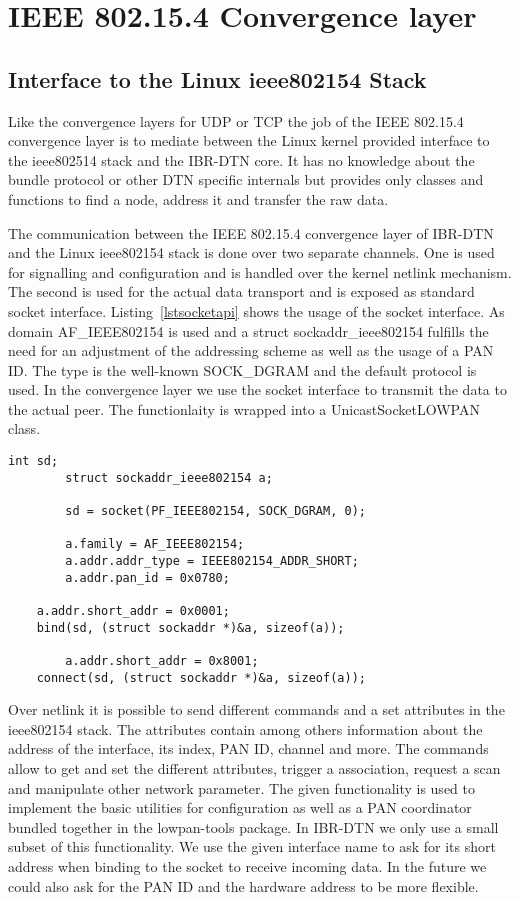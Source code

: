 \chapter{IEEE 802.15.4 Convergence layer}
\label{802154layer}
\section{Interface to the Linux ieee802154 Stack}

Like the convergence layers for UDP or TCP the job of the IEEE 802.15.4
convergence layer is to mediate between the Linux kernel provided interface
to the ieee802514 stack and the IBR-DTN core. It has no knowledge about the
bundle protocol or other DTN specific internals but provides only classes and
functions to find a node, address it and transfer the raw data.

The communication between the IEEE 802.15.4 convergence layer of IBR-DTN and the
Linux ieee802154 stack is done over two separate channels. One is used for
signalling and configuration and is handled over the kernel netlink mechanism.
The second is used for the actual data transport and is exposed as standard
socket interface. Listing~\ref{lstsocketapi} shows the usage of the socket interface.
As domain AF\_IEEE802154 is used and a struct sockaddr\_ieee802154 fulfills the
need for an adjustment of the addressing scheme as well as the usage of a PAN
ID. The type is the well-known SOCK\_DGRAM and the default protocol is used. In the
convergence layer we use the socket interface to transmit the data to the actual
peer. The functionlaity is wrapped into a UnicastSocketLOWPAN class.

\begin{lstlisting}[caption= ieee802154 socket interface, label=lstsocketapi]
        int sd;
        struct sockaddr_ieee802154 a;

        sd = socket(PF_IEEE802154, SOCK_DGRAM, 0);

        a.family = AF_IEEE802154;
        a.addr.addr_type = IEEE802154_ADDR_SHORT;
        a.addr.pan_id = 0x0780;

	a.addr.short_addr = 0x0001;
	bind(sd, (struct sockaddr *)&a, sizeof(a));

        a.addr.short_addr = 0x8001;
	connect(sd, (struct sockaddr *)&a, sizeof(a));
\end{lstlisting}

Over netlink it is possible to send different commands and a set attributes in the
ieee802154 stack. The attributes contain among others information about the
address of the interface, its index, PAN ID, channel and more. The commands
allow to get and set the different attributes, trigger a association, request a
scan and manipulate other network parameter. The given functionality is used to
implement the basic utilities for configuration as well as a PAN coordinator
bundled together in the lowpan-tools package. In IBR-DTN we only use a small subset of this
functionality. We use the given interface name to ask for its short address when
binding to the socket to receive incoming data. In the future we could also ask for
the PAN ID and the hardware address to be more flexible.

